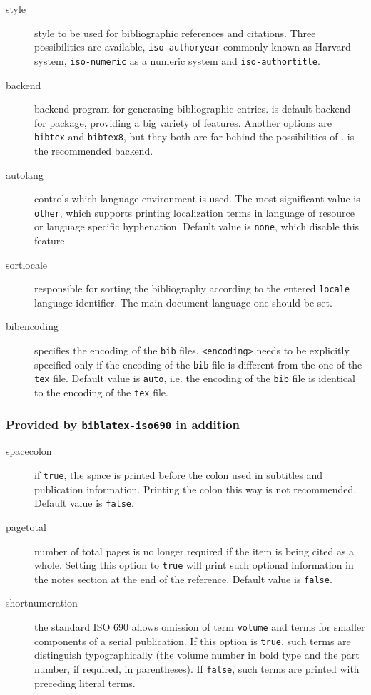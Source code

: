 \documentclass[a4paper,10pt]{ltxdockit}
\def\t|#1|{\texttt{#1}}
\newcommand*{\biber}{\sty{biber}\xspace}
\newcommand*{\biblatex}{\sty{biblatex}\xspace}
\begin{document}
\begin{description}
\item[style] style to be used for bibliographic references and citations.
Three possibilities are available, \t|iso-authoryear| commonly known as
Harvard system, \t|iso-numeric| as a numeric system and \t|iso-authortitle|.

\item[backend] backend program for generating bibliographic entries. \biber
is default backend for \biblatex package, providing a big variety
of features. Another options are \t|bibtex| and \t|bibtex8|, but they both
are far behind the possibilities of \biber. \biber is the recommended backend.

\item[autolang] controls which language environment is used. The most
significant value is \t|other|, which supports printing localization
terms in language of resource or language specific hyphenation. Default
value is \t|none|, which disable this feature.

\item[sortlocale] responsible for sorting the bibliography according to the
entered \t|locale| language identifier. The main document language one should
be set.

\item[bibencoding] specifies the encoding of the \t|bib| files. \t|<encoding>|
needs to be explicitly specified only if the encoding of the \t|bib| file
is different from the one of the \t|tex| file. Default value is \t|auto|, i.e.
the encoding of the \t|bib| file is identical to the encoding of the \t|tex|
file.
\end{description}

\subsubsection{Provided by \t|biblatex-iso690| in addition}

\begin{description}
  \item[spacecolon] if \t|true|, the space is printed before the colon
  used in subtitles and publication information. Printing the colon this way
  is not recommended. Default value is \t|false|.

  \item[pagetotal] number of total pages is no longer required if the item
  is being cited as a whole. Setting this option to \t|true| will print
  such optional information in the notes section at the end of the reference.
  Default value is \t|false|.\label{pkg:opt:iso690:pp}

  \item[shortnumeration] the standard ISO 690 allows omission of term
  \t|volume| and terms for smaller components of a serial publication.
  If this option is \t|true|, such terms are distinguish typographically
  (the volume number in bold type and the part number, if required, in
  parentheses). If \t|false|, such terms are printed with preceding
  literal terms.
\end{description}
\end{document}
